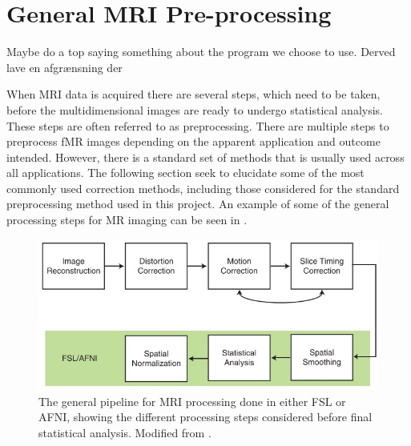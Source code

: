 

\section{General MRI Pre-processing}
Maybe do a top saying something about the program we choose to use. Derved lave en afgrænsning der 

When MRI data is acquired there are several steps, which need to be taken, before the multidimensional images are ready to undergo statistical analysis. These steps are often referred to as preprocessing. \cite{Moayedi2018} 
There are multiple steps to preprocess fMR images depending on the apparent application and outcome intended. However, there is a standard set of methods that is usually used across all applications. The following section seek to elucidate some of the most commonly used correction methods, including those considered for the standard preprocessing method used in this project. An example of some of the general processing steps for MR imaging can be seen in . \cite{Poldrack2011} 

\begin{figure}[H]                 
	\includegraphics[width=.8\textwidth]{figures/aBackground/processing}  
	\caption{The general pipeline for MRI processing done in either FSL or AFNI, showing the different processing steps considered before final statistical analysis. Modified from \cite{Poldrack2011}.}
	\label{fig:back:pipeline} 
\end{figure}


